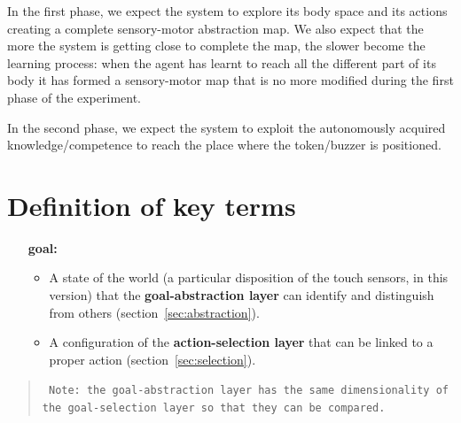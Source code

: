 \documentclass[11pt]{article}
\begin{document}
In the first phase, we expect the system to explore its body
space and its actions creating a complete sensory-motor
abstraction map.  We also expect that the more the system is
getting close to complete the map, the slower become the
learning process: when the agent has learnt to reach all the
different part of its body it has formed a sensory-motor map
that is no more modified during the first phase of the
experiment.

In the second phase, we expect the system to exploit the
autonomously acquired knowledge/competence to reach the place where
the token/buzzer is positioned. 

\section{Definition of key terms}
\label{sec:definitions}

\begin{itemize}[leftmargin=3cm]  
    \item[\textbf{goal:}]

        \begin{itemize}

            \item A state of the world (a particular disposition of the touch sensors, in this version) that the \textbf{goal-abstraction layer}
                can identify and distinguish from others
                (section~\ref{sec:abstraction}).

            \item A configuration of the \textbf{action-selection layer} that
                can be linked to a proper action (section~\ref{sec:selection}).

        \end{itemize}

\end{itemize}

\begin{quote}
    \texttt{
        Note: the goal-abstraction layer has the same dimensionality of\\ 
        the goal-selection layer so that they can be compared.
    }

\end{quote}
\end{document}
